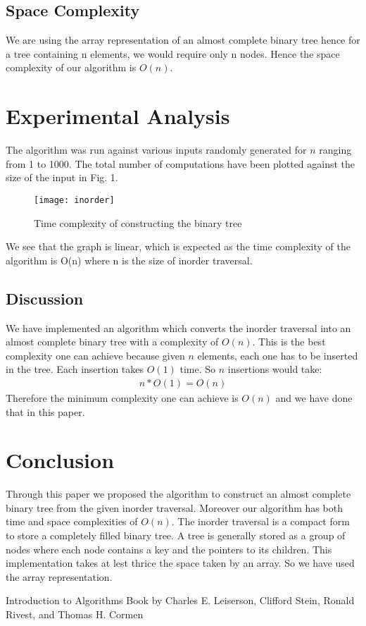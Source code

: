 \documentclass[letterpaper, 12 pt, conference]{ieeeconf}  %
\begin{document}
\subsection{Space Complexity}
We are using the array representation of an almost complete binary tree hence for a tree containing n elements, we would require only n nodes. Hence the space complexity of our algorithm is $O(n)$.

\section{Experimental Analysis}
The algorithm was run against various inputs randomly generated for $n$ ranging from 1 to 1000. The total number of computations have been plotted against the size of the input in Fig. 1.
\begin{figure}[H]
\texttt{[image: inorder]}
\caption{Time complexity of constructing the binary tree}
\end{figure}
We see that the graph is linear, which is expected as the time complexity of the algorithm is O(n) where n is the size of inorder traversal.

\subsection{Discussion}
We have implemented an algorithm which converts the inorder traversal into an almost complete binary tree with a complexity of $O(n)$. This is the best complexity one can achieve because given $n$ elements, each one has to be inserted in the tree. Each insertion takes $O(1)$ time. So $n$ insertions would take:
\begin{align*}
n*O(1) = O(n)
\end{align*}
Therefore the minimum complexity one can achieve is $O(n)$ and we have done that in this paper.

\section{Conclusion}
Through this paper we proposed the algorithm to construct an almost complete binary tree from the given inorder traversal. Moreover our algorithm has both time and space complexities of $O(n)$.
The inorder traversal is a compact form to store a completely filled binary tree. A tree is generally stored as a group of nodes where each node contains a key and the pointers to its children. This implementation takes at lest thrice the space taken by an array. So we have used the array representation.


\begin{thebibliography}{99}

 Introduction to Algorithms
Book by Charles E. Leiserson, Clifford Stein, Ronald Rivest, and Thomas H. Cormen
\end{thebibliography}
\end{document}
